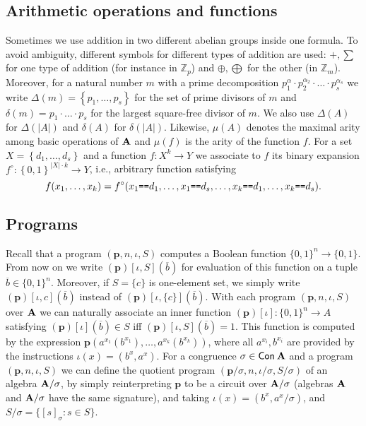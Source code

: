 \documentclass[11pt,a4paper]{amsart}
\newcommand{\m}[1]{{\uppercase {\bf{#1}}}}
\newcommand{\set}[1]{{\left\{ {#1} \right\} }}
\newcommand{\card}[1]{\left| #1 \right|}
\newcommand{\con}[1]{{\sf Con\:\m{#1}}}
\newcommand{\po}[1]{{\mathbf {#1}}}
\newcounter{note}
\renewcommand{\o}[1]{\overline {#1}}
\newcommand{\map}{\longrightarrow}
\newcommand{\z}{\mathbb{Z}}
\newcommand{\prog}[2]{\left(#1\right)\!\left[#2\right]}
\newcommand{\progb}[3]{\left(#1\right)\!\left[#2,#3\right]}
\newcommand{\fcirc}[1]{#1^\circ}
\newcommand{\beq}{\mbox{\tt ==}}
\newcommand{\true}{1}
\newcommand{\false}{0}
\newcommand{\bool}{\set{\false,\true}}
\newcommand{\ccc}{c}    \newcommand{\s}{s}
\newcommand{\sdiv}[1]{\Delta\left(#1\right)}    \newcommand{\ppdiv}{\delta}
\newcommand{\pdiv}[1]{\ppdiv\left(#1\right)}    \newcommand{\ar}[1]{\mu\left({#1}\right)}       \newcommand{\maxar}[1]{\mu\left({\m #1}\right)}
\begin{document}
\subsection*{Arithmetic operations and functions}
Sometimes we use addition in two different abelian groups  inside one formula. To avoid ambiguity, different symbols for different types of addition are used: $+, \sum$  for one type of addition (for instance in $\z_p$) and $\oplus, \bigoplus$ for the other (in $\z_m$). Moreover, for a natural number $m$ with a prime decomposition $p_1^{\alpha} \cdot p_2^{\alpha_2} \cdot \ldots \cdot p_s^{\alpha_s}$ we write $\sdiv m=\set{p_1,\ldots,p_\s}$ for the set of prime divisors of $m$ and $\pdiv m = p_1 \cdot \ldots \cdot p_s$ for the largest square-free divisor of $m$. We also use $\sdiv A$ for $\sdiv {|A|}$ and $\pdiv A$ for $\pdiv {|A|}$. Likewise, $\ar A$ denotes the maximal arity among basic operations of $\m A$ and $\ar f$ is the arity of the function $f$. For a set $X=\set{d_1,\ldots,d_s}$
and a function $f: X^k \map Y$ we associate to $f$ its
binary expansion $\fcirc{f} : \bool^{\card{X}\cdot k} \map Y$,
i.e., arbitrary function satisfying
\[
f(x_1,\ldots,x_k) =
\fcirc{f}(x_1 \beq d_1,\ldots,x_1 \beq d_s,\ldots,x_k \beq d_1,\ldots,x_k \beq d_s).
\]

\subsection*{Programs}
Recall that a program $(\po p, n, \iota, S)$ computes a Boolean function $\{0,1\}^n \rightarrow \{0,1\}$. From now on we write $\progb{\po p}{\iota}{S}(\o b)$ for evaluation of this function on a tuple $\o b \in \{0,1\}^n$. Moreover, if $S = \{c\}$ is one-element set, we simply write $\progb{\po p}{\iota}{\ccc}(\o b)$ instead of $\progb{\po p}{\iota}{\{\ccc\}}(\o b)$. With each program $(\po p, n, \iota, S)$ over $\m A$ we can naturally associate an inner function $\prog{\po p}{\iota}: \{0,1\}^n \rightarrow A$ satisfying $\prog{\po p}{\iota}(\o b) \in S$ iff $\progb{\po p}{\iota}{S}(\o b) = 1$. This function is computed by the expression 
$\po p(a^{x_1}(b^{x_1}),\ldots,a^{x_k}(b^{x_k}))$, where all $a^{x_i}, b^{x_i}$ are provided by the instructions $\iota(x) = (b^x, a^x)$. For a congruence $\sigma \in \con{\m A}$ and a program $(\po p, n, \iota, S)$ we can define the quotient program $(\po p/\sigma, n, \iota/\sigma, S/\sigma)$ of an algebra $\m A/\sigma$, by simply reinterpreting $\po p$ to be a circuit over $\m A/\sigma$ (algebras $\m A$ and $\m A/\sigma$ have the same signature), and taking $\iota(x) = (b^x, a^{x}/\sigma)$, and $S/\sigma = \{[s]_{\sigma}: s\in S\}$.
\end{document}
